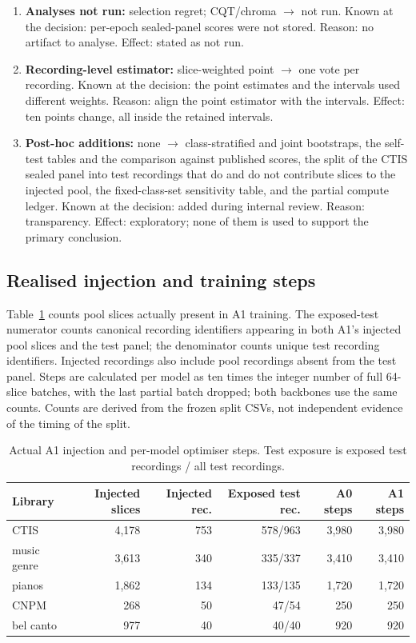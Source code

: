 \begin{enumerate}
\item \textbf{Analyses not run:} selection regret; CQT/chroma $\rightarrow$ not run. Known at the decision: per-epoch sealed-panel scores were not stored. Reason: no artifact to analyse. Effect: stated as not run.
\item \textbf{Recording-level estimator:} slice-weighted point $\rightarrow$ one vote per recording. Known at the decision: the point estimates and the intervals used different weights. Reason: align the point estimator with the intervals. Effect: ten points change, all inside the retained intervals.
\item \textbf{Post-hoc additions:} none $\rightarrow$ class-stratified and joint bootstraps, the self-test tables and the comparison against published scores, the split of the CTIS sealed panel into test recordings that do and do not contribute slices to the injected pool, the fixed-class-set sensitivity table, and the partial compute ledger. Known at the decision: added during internal review. Reason: transparency. Effect: exploratory; none of them is used to support the primary conclusion.
\end{enumerate}

\subsection{Realised injection and training steps}

Table~\ref{tab:realised-injection} counts pool slices actually present in A1 training. The exposed-test numerator counts canonical recording identifiers appearing in both A1's injected pool slices and the test panel; the denominator counts unique test recording identifiers. Injected recordings also include pool recordings absent from the test panel. Steps are calculated per model as ten times the integer number of full 64-slice batches, with the last partial batch dropped; both backbones use the same counts. Counts are derived from the frozen split CSVs, not independent evidence of the timing of the split.

\begin{table}[htbp]\centering\small
\caption{Actual A1 injection and per-model optimiser steps. Test exposure is exposed test recordings / all test recordings.}
\label{tab:realised-injection}
\begin{tabular}{lrrrrr}\toprule
Library & Injected slices & Injected rec. & Exposed test rec. & A0 steps & A1 steps \\\midrule
CTIS & 4{,}178 & 753 & 578/963 & 3{,}980 & 3{,}980 \\
music genre & 3{,}613 & 340 & 335/337 & 3{,}410 & 3{,}410 \\
pianos & 1{,}862 & 134 & 133/135 & 1{,}720 & 1{,}720 \\
CNPM & 268 & 50 & 47/54 & 250 & 250 \\
bel canto & 977 & 40 & 40/40 & 920 & 920 \\
\bottomrule\end{tabular}\end{table}

